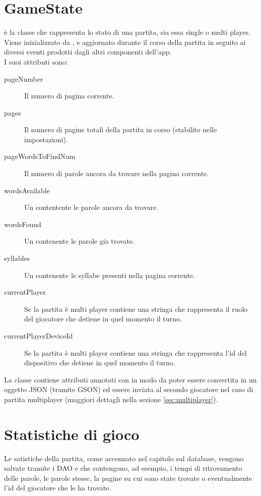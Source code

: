 \section{GameState}
\label{sec:game_state}
 è la classe che rappresenta lo stato di una partita, sia essa single o multi player. Viene inizializzato da , e aggiornato durante il corso della partita in seguito ai diversi eventi prodotti dagli altri componenti dell'app.\\
I suoi attributi sono:
\begin{description}
    \item[pageNumber] Il numero di pagina corrente.
    \item[pages] Il numero di pagine totali della partita in corso (stabilito nelle impostazioni).
    \item[pageWordsToFindNum] Il numero di parole ancora da trovare nella pagina corrente.
    \item[wordsAvailable] Un  contentente le parole ancora da trovare.
    \item[wordsFound] Un  contenente le parole gia trovate.
    \item[syllables] Un  contenente le syllabe presenti nella pagina corrente.
    \item[currentPlayer] Se la partita è multi player contiene una stringa che rappresenta il ruolo del giocatore che detiene in quel momento il turno.
    \item[currentPlayerDeviceId] Se la partita è multi player contiene una stringa che rappresenta l'id del dispositivo che detiene in quel momento il turno.
\end{description}

La classe  contiene attributi annotati con  in modo da poter essere convertita in un oggetto JSON (tramite GSON) ed essere inviata al secondo giocatore nel caso di partita multiplayer (maggiori dettagli nella sezione \ref{sec:multiplayer}).

\section{Statistiche di gioco}
\label{sec:stats}
Le satistiche della partita, come accennato nel capitolo sul database, vengono salvate tramite i DAO  e  che contengono, ad esempio, i tempi di ritrovamento delle parole, le parole stesse, la pagine su cui sono state trovate o eventualmente l'id del giocatore che le ha trovate.

